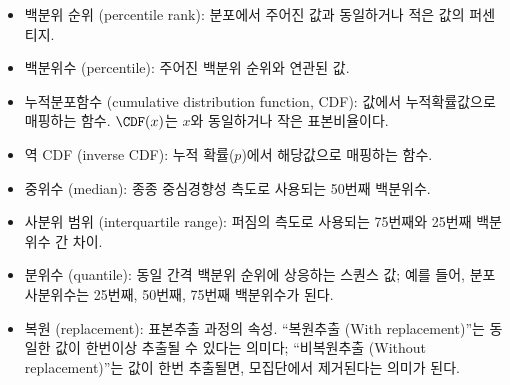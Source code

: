 \begin{itemize}

\item 백분위 순위 (percentile rank): 
분포에서 주어진 값과 동일하거나 적은 값의 퍼센티지.

\item 백분위수 (percentile): 주어진 백분위 순위와 연관된 값.

\item 누적분포함수 (cumulative distribution function, CDF): 
값에서 누적확률값으로 매핑하는 함수. $\CDF(x)$는 $x$와 동일하거나 작은 표본비율이다. 

\item 역 CDF (inverse CDF):
누적 확률($p$)에서 해당값으로 매핑하는 함수.

\item 중위수 (median): 
종종 중심경향성 측도로 사용되는 50번째 백분위수.

\item 사분위 범위 (interquartile range): 
퍼짐의 측도로 사용되는 75번째와 25번째 백분위수 간 차이.

\item 분위수 (quantile): 
동일 간격 백분위 순위에 상응하는 스퀀스 값; 예를 들어, 
분포 사분위수는 25번째, 50번째, 75번째 백분위수가 된다.

\item 복원 (replacement): 
표본추출 과정의 속성. ``복원추출 (With replacement)''는 동일한 값이 한번이상 추출될 수 있다는 의미다;
``비복원추출 (Without replacement)''는 값이 한번 추출될면, 모집단에서 제거된다는 의미가 된다.

\end{itemize}

